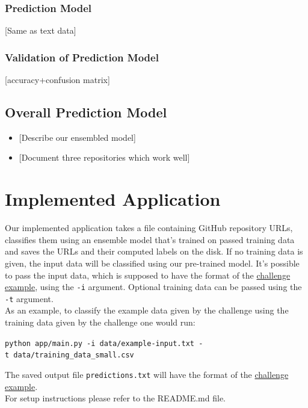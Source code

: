 \documentclass{article}
\providecommand{\tightlist}{%
  \setlength{\itemsep}{0pt}\setlength{\parskip}{0pt}}
\begin{document}
\subsubsection{Prediction Model}\label{prediction-model-2}

{[}Same as text data{]}

\subsubsection{Validation of Prediction
Model}\label{validation-of-prediction-model-2}

{[}accuracy+confusion matrix{]}

\subsection{Overall Prediction
Model}\label{overall-prediction-model}

\begin{itemize}
\tightlist
\item
  {[}Describe our ensembled model{]}
\item
  {[}Document three repositories which work well{]}
\end{itemize}

\section{Implemented Application}\label{implemented-application}

Our implemented application takes a file containing GitHub repository
URLs, classifies them using an ensemble model that's trained on passed
training data and saves the URLs and their computed labels on the disk.
If no training data is given, the input data will be classified using
our pre-trained model. It's possible to pass the input data, which is
supposed to have the format of the
\href{https://github.com/InformatiCup/InformatiCup2017/blob/master/example-input}{challenge
example}, using the \texttt{-i} argument. Optional training data can be
passed using the \texttt{-t} argument.\\
As an example, to classify the example data given by the challenge using
the training data given by the challenge one would run: ~

\texttt{python\ app/main.py\ -i\ data/example-input.txt\ -t\ data/training\_data\_small.csv}

The saved output file \texttt{predictions.txt} will have the format of
the
\href{https://github.com/InformatiCup/InformatiCup2017/blob/master/example-output}{challenge
example}.\\
For setup instructions please refer to the README.md file.
\end{document}
